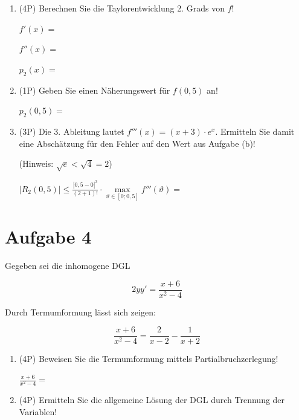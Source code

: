 \documentclass[12pt]{article}
\begin{document}
\begin{enumerate}[label=(\alph*)]

\item (4P) Berechnen Sie die Taylorentwicklung 2. Grads von $f$!

\bigskip

$f'(x) = $

\bigskip

$f''(x) = $

\bigskip

$p_2(x) = $

\bigskip
\bigskip
\bigskip
\bigskip
\bigskip

\item (1P) Geben Sie einen Näherungswert für $f(0{,}5)$ an!

\bigskip

$p_2(0{,}5) = $

\bigskip
\bigskip

\item (3P) Die 3. Ableitung lautet $f'''(x)=(x+3)\cdot e^x$. Ermitteln Sie damit eine Abschätzung für den Fehler auf den Wert aus Aufgabe (b)! 

(Hinweis: $\sqrt{e} < \sqrt{4} = 2$)

\bigskip

$|R_2(0{,}5)| \le \frac{|0{,}5-0|^3}{(2+1)!}\cdot\max\limits_{\vartheta\in[0;0{,}5]} f'''(\vartheta) =$

\end{enumerate}

\newpage
\section* {Aufgabe 4}

Gegeben sei die inhomogene DGL

$$2yy' = \frac{x+6}{x^2-4}$$

Durch Termumformung lässt sich zeigen:

$$\frac{x+6}{x^2-4} = \frac{2}{x-2} - \frac{1}{x+2}$$

\begin{enumerate}[label=(\alph*)]

\item (4P) Beweisen Sie die Termumformung mittels Partialbruchzerlegung!

$\frac{x+6}{x^2-4} = $

\bigskip
\bigskip
\bigskip
\bigskip
\bigskip
\bigskip
\bigskip
\bigskip
\bigskip
\bigskip
\bigskip
\bigskip

\item (4P) Ermitteln Sie die allgemeine Lösung der DGL durch Trennung der Variablen!

\bigskip
\bigskip
\bigskip
\bigskip
\bigskip
\bigskip
\bigskip
\bigskip
\bigskip

\end{enumerate}
\end{document}
